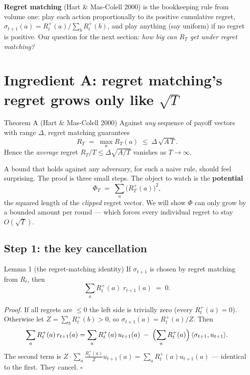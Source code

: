 \documentclass[11pt,a4paper]{article}
\begin{document}
\textbf{Regret matching} (Hart \& Mas-Colell 2000) is the bookkeeping rule
from volume one: play each action proportionally to its positive cumulative
regret, $\sigma_{t+1}(a) = R_t^{+}(a) \big/ \sum_b R_t^{+}(b)$, and play
anything (say uniform) if no regret is positive. Our question for the next
section: \emph{how big can $R_T$ get under regret matching?}

\section{Ingredient A: regret matching's regret grows only like $\sqrt{T}$}

\begin{thmbox}{Theorem A (Hart \& Mas-Colell 2000)}
Against \emph{any} sequence of payoff vectors with range $\Delta$, regret
matching guarantees
\[
R_T \;=\; \max_a R_T(a) \;\le\; \Delta\,\sqrt{A\,T}.
\]
Hence the \emph{average} regret $R_T/T \le \Delta\sqrt{A/T}$ vanishes as
$T \to \infty$.
\end{thmbox}

A bound that holds against any adversary, for such a naive rule, should feel
surprising. The proof is three small steps. The object to watch is the
\textbf{potential}
\[
\Phi_T \;=\; \sum_a \bigl(R_T^{+}(a)\bigr)^2,
\]
the squared length of the \emph{clipped} regret vector. We will show
$\Phi$ can only grow by a bounded amount per round --- which forces every
individual regret to stay $O(\sqrt{T})$.

\subsection{Step 1: the key cancellation}

\begin{thmbox}{Lemma 1 (the regret-matching identity)}
If $\sigma_{t+1}$ is chosen by regret matching from $R_t$, then
\[
\sum_a R_t^{+}(a)\; r_{t+1}(a) \;=\; 0 .
\]
\end{thmbox}

\emph{Proof.} If all regrets are $\le 0$ the left side is trivially zero
(every $R^{+}_t(a)=0$). Otherwise let $Z = \sum_b R_t^{+}(b) > 0$, so
$\sigma_{t+1}(a) = R_t^{+}(a)/Z$. Then
\[
\sum_a R_t^{+}(a)\,r_{t+1}(a)
= \sum_a R_t^{+}(a)\,u_{t+1}(a)
\;-\; \Bigl(\sum_a R_t^{+}(a)\Bigr)\,\langle\sigma_{t+1},u_{t+1}\rangle .
\]
The second term is
$Z \cdot \sum_a \frac{R_t^{+}(a)}{Z} u_{t+1}(a) = \sum_a R_t^{+}(a)u_{t+1}(a)$
--- identical to the first. They cancel. $\square$
\end{document}
